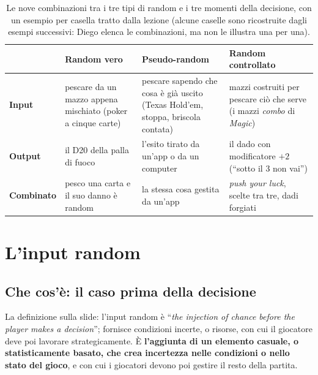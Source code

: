 \begin{table}[htbp]
\centering
\small
\begin{tabular}{@{}>{\raggedright\arraybackslash}p{2.3cm}>{\raggedright\arraybackslash}p{3.7cm}>{\raggedright\arraybackslash}p{3.7cm}>{\raggedright\arraybackslash}p{3.7cm}@{}}
\toprule
 & \textbf{Random vero} & \textbf{Pseudo-random} & \textbf{Random controllato} \\
\midrule
\textbf{Input} & pescare da un mazzo appena mischiato (poker a cinque carte) & pescare
  sapendo che cosa è già uscito (Texas Hold'em, stoppa, briscola contata) & mazzi costruiti
  per pescare ciò che serve (i mazzi \emph{combo} di \emph{Magic}) \\
\addlinespace
\textbf{Output} & il D20 della palla di fuoco & l'esito tirato da un'app o da un computer &
  il dado con modificatore $+2$ (``sotto il 3 non vai'') \\
\addlinespace
\textbf{Combinato} & pesco una carta e il suo danno è random & la stessa cosa gestita da
  un'app & \emph{push your luck}, scelte tra tre, dadi forgiati \\
\bottomrule
\end{tabular}
\caption{Le nove combinazioni tra i tre tipi di random e i tre momenti della decisione,
con un esempio per casella tratto dalla lezione (alcune caselle sono ricostruite dagli
esempi successivi: Diego elenca le combinazioni, ma non le illustra una per una).}
\label{a15:tab:nove}
\end{table}

\section{L'input random}
\label{a15:sec:input}

\subsection{Che cos'è: il caso prima della decisione}

La definizione sulla slide: l'input random è ``\emph{the injection of chance before the
player makes a decision}''; fornisce condizioni incerte, o risorse, con cui il giocatore
deve poi lavorare strategicamente. È \textbf{l'aggiunta di un elemento casuale, o
statisticamente basato, che crea incertezza nelle condizioni o nello stato del gioco}, e con
cui i giocatori devono poi gestire il resto della partita.

